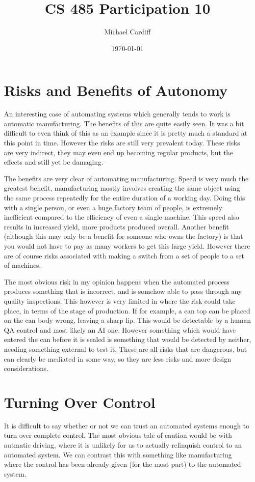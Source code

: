 \documentclass[12pt]{article}
\title{\vspace{-3em}CS 485 Participation 10}
\author{Michael Cardiff}
\date{\today}
\begin{document}
\maketitle

\section{Risks and Benefits of Autonomy}
An interesting case of automating systems which generally tends to work is automatic manufacturing. The benefits of this are quite easily seen. It was a bit difficult to even think of this as an example since it is pretty much a standard at this point in time. However the risks are still very prevalent today. These risks are very indirect, they may even end up becoming regular products, but the effects and still yet be damaging.

The benefits are very clear of automating manufacturing. Speed is very much the greatest benefit, manufacturing mostly involves creating the same object using the same process repeatedly for the entire duration of a working day. Doing this with a single person, or even a huge factory team of people, is extremely inefficient compared to the efficiency of even a single machine. This speed also results in increased yield, more products produced overall. Another benefit (although this may only be a benefit for someone who owns the factory) is that you would not have to pay as many workers to get this large yield. However there are of course risks associated with making a switch from a set of people to a set of machines.

The most obvious risk in my opinion happens when the automated process produces something that is incorrect, and is somehow able to pass through any quality inspections. This however is very limited in where the risk could take place, in terms of the stage of production. If for example, a can top can be placed on the can body wrong, leaving a sharp lip. This would be detectable by a human QA control and most likely an AI one. However something which would have entered the can before it is sealed is something that would be detected by neither, needing something external to test it. These are all risks that are dangerous, but can clearly be mediated in some way, so they are less risks and more design considerations.
\pagebreak
\section{Turning Over Control}
It is difficult to say whether or not we can trust an automated systems enough to turn over complete control. The most obvious tale of caution would be with autmatic driving, where it is unlikely for us to actually relinquish control to an automated system. We can contrast this with something like manufacturing where the control has been already given (for the most part) to the automated system.
\end{document}
